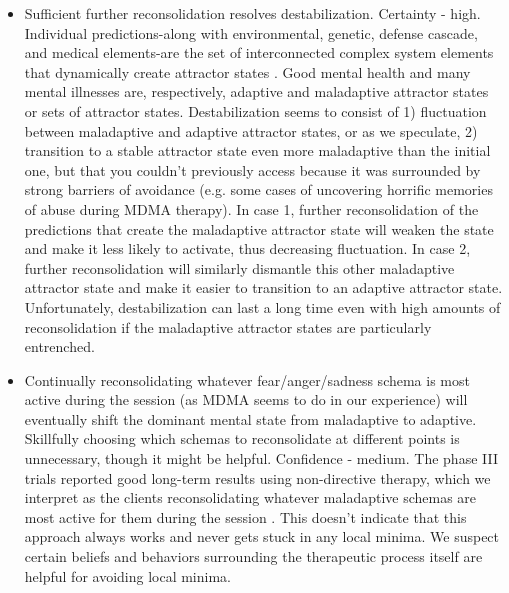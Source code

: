 \documentclass[12pt,letterpaper]{book}
\begin{document}
\begin{itemize}
	\item Sufficient further reconsolidation resolves destabilization. Certainty - high. Individual predictions-along with environmental, genetic, defense cascade, and medical elements-are the set of interconnected complex system elements that dynamically create attractor states \cite{hayes2020complex,friston2010free}. Good mental health and many mental illnesses are, respectively, adaptive and maladaptive attractor states or sets of attractor states. Destabilization seems to consist of 1) fluctuation between maladaptive and adaptive attractor states, or as we speculate, 2) transition to a stable attractor state even more maladaptive than the initial one, but that you couldn't previously access because it was surrounded by strong barriers of avoidance (e.g. some cases of uncovering horrific memories of abuse during MDMA therapy). In case 1, further reconsolidation of the predictions that create the maladaptive attractor state will weaken the state and make it less likely to activate, thus decreasing fluctuation. In case 2, further reconsolidation will similarly dismantle this other maladaptive attractor state and make it easier to transition to an adaptive attractor state. Unfortunately, destabilization can last a long time even with high amounts of reconsolidation if the maladaptive attractor states are particularly entrenched.
	\item Continually reconsolidating whatever fear/anger/sadness schema is most active during the session (as MDMA seems to do in our experience) will eventually shift the dominant mental state from maladaptive to adaptive. Skillfully choosing which schemas to reconsolidate at different points is unnecessary, though it might be helpful. Confidence - medium. The phase III trials reported good long-term results using non-directive therapy, which we interpret as the clients reconsolidating whatever maladaptive schemas are most active for them during the session \cite{mitchellMDMAClinicalTrial2,mitchellMDMAClinicalTrial,mithoeferManual}. This doesn't indicate that this approach always works and never gets stuck in any local minima. We suspect certain beliefs and behaviors surrounding the therapeutic process itself are helpful for avoiding local minima.
\end{itemize}
\end{document}
